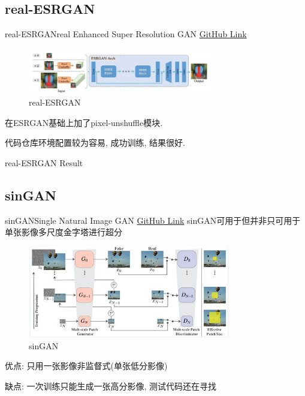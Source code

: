 \subsection{real-ESRGAN}
\begin{frame}{real-ESRGAN}{real Enhanced Super Resolution GAN \href{https://github.com/xinntao/Real-ESRGAN}{GitHub Link}}
    \begin{figure}
        \centering
        \includegraphics[height=2cm]{pic/pic0107.jpg}
        \caption{real-ESRGAN}
        \label{fig:0107}
    \end{figure}
    在ESRGAN基础上加了pixel-unshuffle模块.

    代码仓库环境配置较为容易, 成功训练, 结果很好.
\end{frame}

\begin{frame}{real-ESRGAN Result}
    
\end{frame}

\subsection{sinGAN}
\begin{frame}{sinGAN}{Single Natural Image GAN \href{https://github.com/tamarott/SinGAN}{GitHub Link}}
    sinGAN可用于但并非只可用于单张影像多尺度金字塔进行超分
    \begin{figure}
        \centering
        \includegraphics[height=4cm]{pic/pic0110.jpg}
        \caption{sinGAN}
        \label{fig:0110}
    \end{figure}
    
    优点: 只用一张影像非监督式(单张低分影像)

    缺点: 一次训练只能生成一张高分影像, 测试代码还在寻找
\end{frame}

